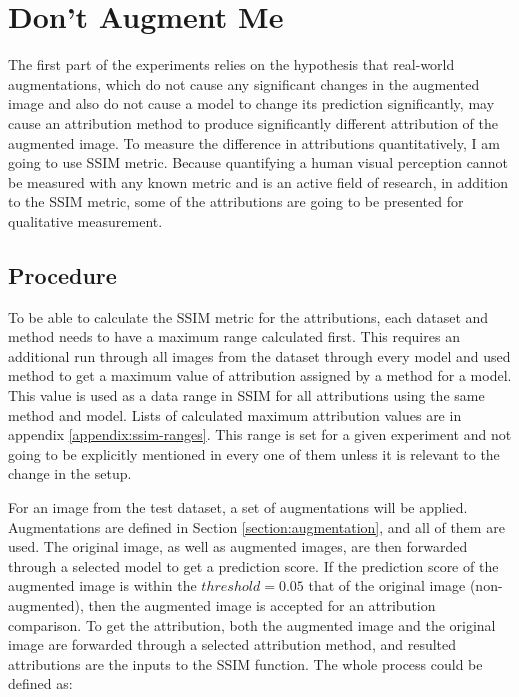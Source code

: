 \section{Don’t Augment Me}\label{section:dont-augment-me-definition}

The first part of the experiments relies on the hypothesis that real-world augmentations, which do not cause any significant changes in the augmented image and also do not cause a model to change its prediction significantly, may cause an attribution method to produce significantly different attribution of the augmented image. To measure the difference in attributions quantitatively, I am going to use SSIM \cite{wang2004image} metric. Because quantifying a human visual perception cannot be measured with any known metric and is an active field of research, in addition to the SSIM metric, some of the attributions are going to be presented for qualitative measurement.

\subsection*{Procedure}

To be able to calculate the SSIM metric for the attributions, each dataset and method needs to have a maximum range calculated first. This requires an additional run through all images from the dataset through every model and used method to get a maximum value of attribution assigned by a method for a model. This value is used as a data range in SSIM for all attributions using the same method and model. Lists of calculated maximum attribution values are in appendix \ref{appendix:ssim-ranges}. This range is set for a given experiment and not going to be explicitly mentioned in every one of them unless it is relevant to the change in the setup.

\vspace{\baselineskip}

For an image from the test dataset, a set of augmentations will be applied. Augmentations are defined in Section \ref{section:augmentation}, and all of them are used. The original image, as well as augmented images, are then forwarded through a selected model to get a prediction score. If the prediction score of the augmented image is within the $threshold = 0.05$ that of the original image (non-augmented), then the augmented image is accepted for an attribution comparison. To get the attribution, both the augmented image and the original image are forwarded through a selected attribution method, and resulted attributions are the inputs to the SSIM function. The whole process could be defined as:

